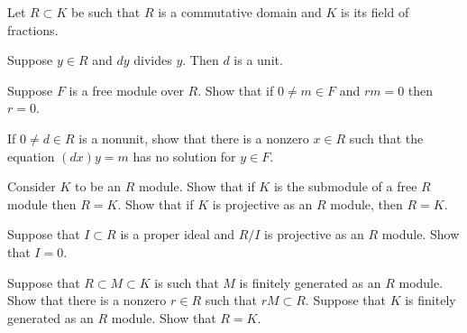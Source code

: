 Let $R\subset K$ be such that $R$ is a commutative domain and $K$ is
its field of fractions.
\begin{alist}
\item Suppose $y\in R$ and $dy$ divides $y$. Then $d$ is a unit.
\item Suppose $F$ is a free module over $R$. Show that if $0\neq m\in
F$ and $rm=0$ then $r=0$. 

If $0\neq d\in R$ is a nonunit, show that there is a nonzero $x\in R$
such that the equation $(dx)y=m$ has no solution for $y\in F$.
\item Consider $K$ to be an $R$ module. Show that if $K$ is the submodule
of a free $R$ module then $R=K$. Show that if $K$ is projective as an
$R$ module, then $R=K$.
\item Suppose that $I \subset R $ is a proper ideal and $R/I$ is
projective as an $R$ module. Show that $I=0$.
\item Suppose that $R\subset M\subset K$ is such that $M$ is finitely 
generated as an $R$ module. Show that there is a nonzero $r\in R$ such
that $rM\subset R$. Suppose that $K$ is finitely generated as an $R$
module. Show that $R=K$.
\end{alist}
